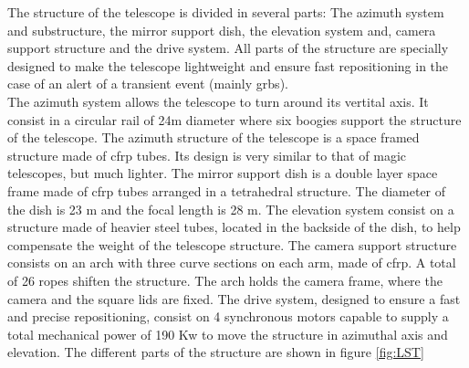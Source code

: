 \documentclass[main.tex]{subfiles}
\begin{document}
The structure of the telescope is divided in several parts: The azimuth system and substructure, the mirror support dish, the elevation system and, camera support structure and the drive system. All parts of the structure are specially designed to make the telescope lightweight and ensure fast repositioning in the case of an alert of a transient event (mainly \glspl{grb}).\\
The azimuth system allows the telescope to turn around its vertital axis. It consist in a circular rail of 24m diameter where six boogies support the structure of the telescope. The azimuth structure of the telescope is a space framed structure made of \gls{cfrp} tubes. Its design is very similar to that of \gls{magic} telescopes, but much lighter. The mirror support dish is a double layer space frame made of \gls{cfrp} tubes arranged in a tetrahedral structure. The diameter of the dish is 23 m and the focal length is 28 m. The elevation system consist on a structure made of heavier steel tubes, located in the backside of the dish, to help compensate the weight of the telescope structure. The camera support structure consists on an arch with three curve sections on each arm, made of \gls{cfrp}. A total of 26 ropes shiften the structure. The arch holds the camera frame, where the camera and the square lids are fixed. The drive system, designed to ensure a fast and precise repositioning, consist on 4 synchronous motors capable to supply a total mechanical power of 190 Kw to move the structure in azimuthal axis and elevation. The different parts of the structure are shown in figure \ref{fig:LST}
    
\end{document}
